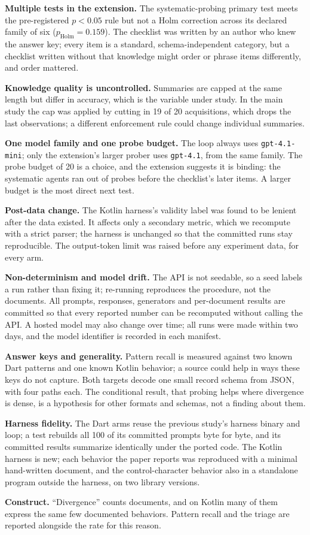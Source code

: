 \textbf{Multiple tests in the extension.} The systematic-probing primary
test meets the pre-registered $p < 0.05$ rule but not a Holm correction
across its declared family of six ($p_{\mathrm{Holm}} = 0.159$). The
checklist was written by an author who knew the answer key; every item is a
standard, schema-independent category, but a checklist written without that
knowledge might order or phrase items differently, and order mattered.

\textbf{Knowledge quality is uncontrolled.} Summaries are capped at the
same length but differ in accuracy, which is the variable under study. In the
main study the cap was applied by cutting in 19 of 20 acquisitions, which drops the last
observations; a different enforcement rule could change individual
summaries.

\textbf{One model family and one probe budget.} The loop always uses
\texttt{gpt-4.1-mini}; only the extension's larger prober uses
\texttt{gpt-4.1}, from the same family. The probe budget of 20 is a choice,
and the extension suggests it is binding: the systematic agents ran out of
probes before the checklist's later items. A larger budget is the most
direct next test.

\textbf{Post-data change.} The Kotlin harness's validity label was found to
be lenient after the data existed. It affects only a secondary metric, which
we recompute with a strict parser; the harness is unchanged so that the
committed runs stay reproducible. The output-token limit was raised before
any experiment data, for every arm.

\textbf{Non-determinism and model drift.} The API is not seedable, so a
seed labels a run rather than fixing it; re-running reproduces the procedure,
not the documents. All prompts, responses, generators and per-document
results are committed so that every reported number can be recomputed without
calling the API. A hosted model may also change over time; all runs were
made within two days, and the model identifier is recorded in each
manifest.

\textbf{Answer keys and generality.} Pattern recall is measured against two
known Dart patterns and one known Kotlin behavior; a source could help in
ways these keys do not capture. Both targets decode one small record schema
from JSON, with four paths each. The conditional result, that probing helps
where divergence is dense, is a hypothesis for other formats and schemas, not
a finding about them.

\textbf{Harness fidelity.} The Dart arms reuse the previous study's harness
binary and loop; a test rebuilds all 100 of its committed prompts byte for
byte, and its committed results summarize identically under the ported
code. The Kotlin harness is new; each behavior the paper reports was
reproduced with a minimal hand-written document, and the control-character
behavior also in a standalone program outside the harness, on two library
versions.

\textbf{Construct.} ``Divergence'' counts documents, and on Kotlin many of
them express the same few documented behaviors. Pattern recall and the
triage are reported alongside the rate for this reason.
